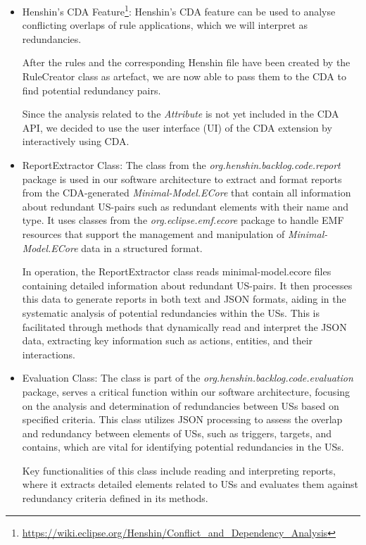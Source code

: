 \begin{itemize}
	\item Henshin's CDA Feature\footnote{\href{https://wiki.eclipse.org/Henshin/Conflict\_and\_Dependency\_Analysis}{https://wiki.eclipse.org/Henshin/Conflict\_and\_Dependency\_Analysis}}: Henshin's CDA feature can be used to analyse conflicting overlaps of rule applications,	which we will interpret as redundancies.
	
	After the rules and the corresponding Henshin file have been created by the RuleCreator class as artefact, we are now able to pass them to the CDA to find potential redundancy pairs.
	
	Since the analysis related to the \textit{Attribute} is not yet included in the CDA API, we decided to use the user interface (UI) of the CDA extension by interactively using CDA.
	
	\item ReportExtractor Class: The class from the \textit{org.henshin.backlog.code.report} package is used in our software architecture to extract and format reports from the CDA-generated \textit{Minimal-Model.ECore} that contain all information about redundant US-pairs such as redundant elements with their name and type. It uses classes from the \textit{org.eclipse.emf.ecore} package to handle EMF resources that support the management and manipulation of \textit{Minimal-Model.ECore} data in a structured format.
	
	In operation, the ReportExtractor class reads minimal-model.ecore files containing detailed information about redundant US-pairs. It then processes this data to generate reports in both text and JSON formats, aiding in the systematic analysis of potential redundancies within the USs. This is facilitated through methods that dynamically read and interpret the JSON data, extracting key information such as actions, entities, and their interactions.
	
	\item Evaluation Class: The class is part of the \textit{org.henshin.backlog.code.evaluation} package, serves a critical function within our software architecture, focusing on the analysis and determination of redundancies between USs based on specified criteria. This class utilizes JSON processing to assess the overlap and redundancy between elements of USs, such as triggers, targets, and contains, which are vital for identifying potential redundancies in the USs.
	
	Key functionalities of this class include reading and interpreting reports, where it extracts detailed elements related to USs and evaluates them against redundancy criteria defined in its methods. %
	
	\end{itemize}
